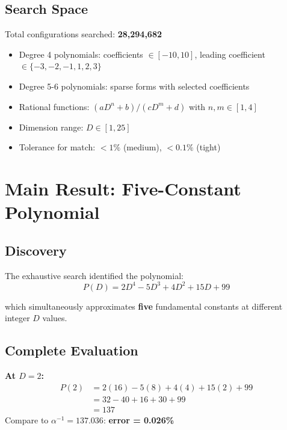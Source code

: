 \documentclass[11pt,a4paper]{article}
\begin{document}
\subsection{Search Space}

Total configurations searched: \textbf{28,294,682}

\begin{itemize}
    \item Degree 4 polynomials: coefficients $\in [-10, 10]$, leading coefficient $\in \{-3,-2,-1,1,2,3\}$
    \item Degree 5-6 polynomials: sparse forms with selected coefficients
    \item Rational functions: $(aD^n + b)/(cD^m + d)$ with $n,m \in [1,4]$
    \item Dimension range: $D \in [1, 25]$
    \item Tolerance for match: $< 1\%$ (medium), $< 0.1\%$ (tight)
\end{itemize}

\section{Main Result: Five-Constant Polynomial}

\subsection{Discovery}

The exhaustive search identified the polynomial:
\begin{equation}
\boxed{P(D) = 2D^4 - 5D^3 + 4D^2 + 15D + 99}
\end{equation}

which simultaneously approximates \textbf{five} fundamental constants at different integer $D$ values.

\subsection{Complete Evaluation}

\textbf{At $D = 2$:}
\begin{align}
P(2) &= 2(16) - 5(8) + 4(4) + 15(2) + 99 \nonumber \\
     &= 32 - 40 + 16 + 30 + 99 \nonumber \\
     &= 137
\end{align}
Compare to $\alpha^{-1} = 137.036$: \textbf{error = 0.026\%}
\end{document}
